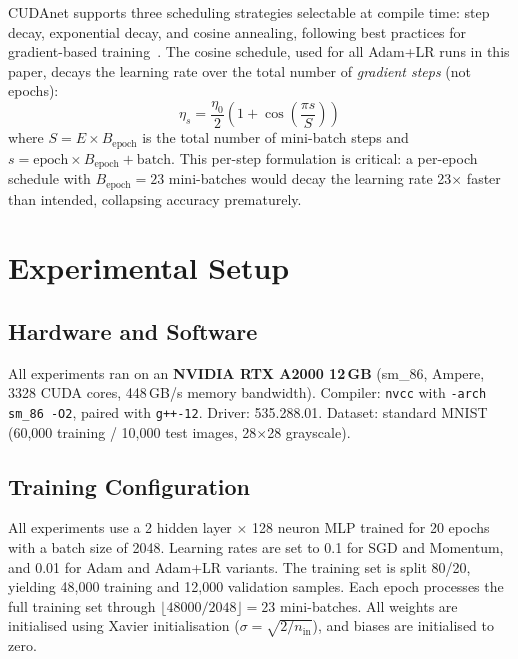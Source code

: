 \documentclass[runningheads]{llncs}
\begin{document}
CUDAnet supports three scheduling strategies selectable at compile time:
step decay, exponential decay, and cosine annealing, following best
practices for gradient-based training~\cite{b9}. The cosine schedule, used
for all Adam+LR runs in this paper, decays the learning rate over the total
number of \emph{gradient steps} (not epochs):
\begin{equation}
  \eta_s = \frac{\eta_0}{2}\left(1 + \cos\!\left(\frac{\pi s}{S}\right)\right)
\end{equation}
where $S = E \times B_\text{epoch}$ is the total number of mini-batch
steps and $s = \text{epoch} \times B_\text{epoch} + \text{batch}$. This
per-step formulation is critical: a per-epoch schedule with
$B_\text{epoch}=23$ mini-batches would decay the learning rate 23$\times$
faster than intended, collapsing accuracy prematurely.

\section{Experimental Setup}

\subsection{Hardware and Software}

All experiments ran on an \textbf{NVIDIA RTX A2000 12\,GB} (sm\_86,
Ampere, 3328 CUDA cores, 448\,GB/s memory bandwidth). Compiler:
\texttt{nvcc} with \texttt{-arch sm\_86 -O2}, paired with \texttt{g++-12}.
Driver: 535.288.01. Dataset: standard MNIST~\cite{b1} (60,000 training /
10,000 test images, 28$\times$28 grayscale).

\subsection{Training Configuration}

All experiments use a 2 hidden layer $\times$ 128 neuron MLP trained for
20 epochs with a batch size of 2048. Learning rates are set to 0.1 for SGD
and Momentum, and 0.01 for Adam and Adam+LR variants. The training set is
split 80/20, yielding 48,000 training and 12,000 validation samples. Each
epoch processes the full training set through $\lfloor 48000/2048 \rfloor
= 23$ mini-batches. All weights are initialised using Xavier initialisation
($\sigma = \sqrt{2/n_\text{in}}$), and biases are initialised to zero.
\end{document}

